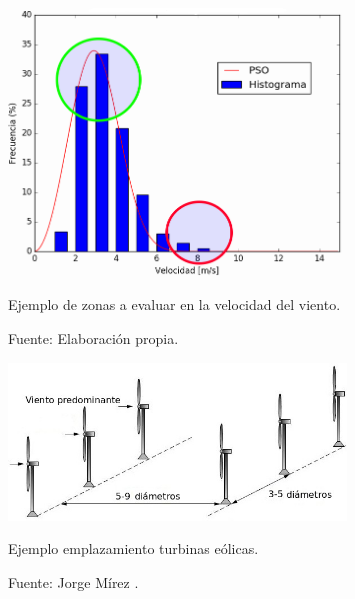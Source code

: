 \begin{figure}[ht!]
    \centering
    \captionsetup{justification=centering,margin=2cm}
        \includegraphics[width=0.8\textwidth]{figures/result_2014_ejemplo_potencial.png}  
    \caption{Ejemplo de zonas a evaluar en la velocidad del viento.}
    \caption*{Fuente: Elaboración propia.}
    \label{fig:ejemplo_potencial}
\end{figure}

\begin{figure}[ht!]
    \centering
    \captionsetup{justification=centering,margin=2cm}
        \includegraphics[width=0.8\textwidth]{figures/ejemplo_emplazamiento.jpg}  
    \caption{Ejemplo emplazamiento turbinas eólicas.}
    \caption*{Fuente: Jorge Mírez \cite{figureEmplacement}.}
    \label{fig:ejemplo_emplazamiento}
\end{figure}

